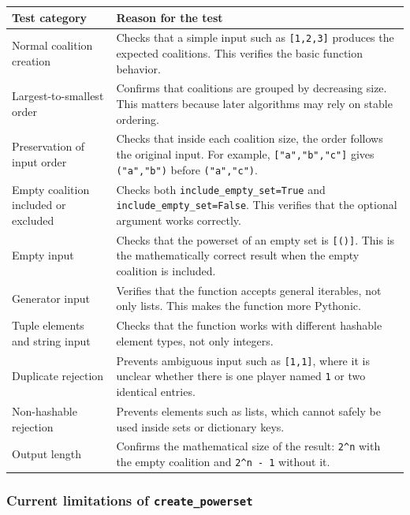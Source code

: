 \documentclass[11pt]{article}
\begin{document}
\begin{center}
\begin{tabularx}{0.95\linewidth}{@{}p{5.2cm}Y@{}}
\toprule
\textbf{Test category} & \textbf{Reason for the test} \\
\midrule
Normal coalition creation
& Checks that a simple input such as \texttt{[1,2,3]} produces the expected
coalitions. This verifies the basic function behavior. \\
Largest-to-smallest order
& Confirms that coalitions are grouped by decreasing size. This matters because later algorithms may rely on stable
ordering. \\
Preservation of input order
& Checks that inside each coalition size, the order follows the original input.
For example, \texttt{["a","b","c"]} gives \texttt{("a","b")} before
\texttt{("a","c")}. \\
Empty coalition included or excluded
& Checks both \texttt{include\_empty\_set=True} and
\texttt{include\_empty\_set=False}. This verifies that the optional argument
works correctly. \\
Empty input
& Checks that the powerset of an empty set is \texttt{[()]}. This is the
mathematically correct result when the empty coalition is included. \\
Generator input
& Verifies that the function accepts general iterables, not only lists. This
makes the function more Pythonic. \\
Tuple elements and string input
& Checks that the function works with different hashable element types, not
only integers. \\
Duplicate rejection
& Prevents ambiguous input such as \texttt{[1,1]}, where it is unclear whether
there is one player named \texttt{1} or two identical entries. \\
Non-hashable rejection
& Prevents elements such as lists, which cannot safely be used inside sets or
dictionary keys. \\
Output length
& Confirms the mathematical size of the result:
\texttt{2\^{}n} with the empty coalition and \texttt{2\^{}n - 1} without it. \\
\bottomrule
\end{tabularx}
\end{center}

\subsubsection*{Current limitations of \texttt{create\_powerset}}
\end{document}
